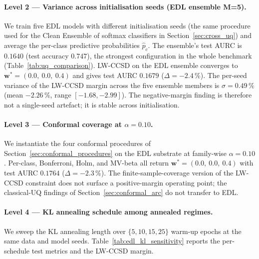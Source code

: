 \documentclass[journal]{IEEEtran}
\begin{document}
\paragraph{Level 2 --- Variance across initialisation seeds (EDL ensemble M=5).}
\label{sec:edl_ensemble}
We train five EDL models with different initialisation seeds (the same procedure used for the Clean Ensemble of softmax classifiers in Section~\ref{sec:cross_uq}) and average the per-class predictive probabilities $\hat{p}_c$. The ensemble's test AURC is $\mathbf{0.1640}$ (test accuracy $\mathbf{0.747}$), the strongest configuration in the whole benchmark (Table~\ref{tab:uq_comparison}). LW-CCSD on the EDL ensemble converges to $\mathbf{w}^{*} = (0.0,\ 0.0,\ 0.4)$ and gives test AURC $0.1679$ ($\Delta = -2.4\,\%$). The per-seed variance of the LW-CCSD margin across the five ensemble members is $\sigma = 0.49\,\%$ (mean $-2.26\,\%$, range $[-1.68, -2.99]$). The negative-margin finding is therefore not a single-seed artefact; it is stable across initialisation.

\paragraph{Level 3 --- Conformal coverage at $\alpha = 0.10$.} We instantiate the four conformal procedures of Section~\ref{sec:conformal_procedures} on the EDL substrate at family-wise $\alpha = 0.10$. Per-class, Bonferroni, Holm, and MV-beta all return $\mathbf{w}^{*} = (0.0,\ 0.0,\ 0.4)$ with test AURC $0.1764$ ($\Delta = -2.3\,\%$). The finite-sample-coverage version of the LW-CCSD constraint does not surface a positive-margin operating point; the classical-UQ findings of Section~\ref{sec:conformal_arc} do not transfer to EDL.

\paragraph{Level 4 --- KL annealing schedule among annealed regimes.}
\label{sec:edl_kl_sensitivity}
We sweep the KL annealing length over $\{5, 10, 15, 25\}$ warm-up epochs at the same data and model seeds. Table~\ref{tab:edl_kl_sensitivity} reports the per-schedule test metrics and the LW-CCSD margin.
\end{document}
